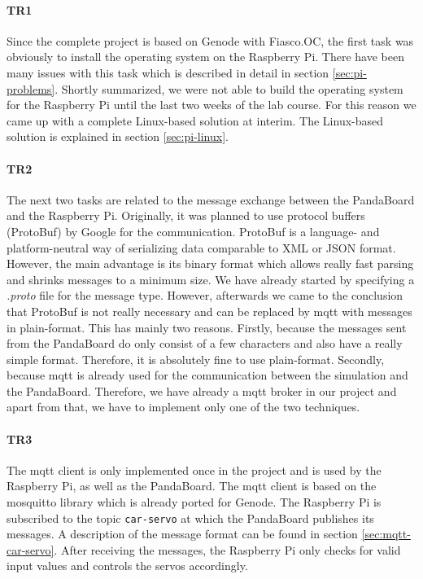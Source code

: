 \paragraph{\textbf{TR1}} Since the complete project is based on Genode with Fiasco.OC, the first task was obviously to install the operating system on the Raspberry Pi. There have been many issues with this task which is described in detail in section \ref{sec:pi-problems}. Shortly summarized, we were not able to build the operating system for the Raspberry Pi until the last two weeks of the lab course. For this reason we came up with a complete Linux-based solution at interim. The Linux-based solution is explained in section \ref{sec:pi-linux}.

\paragraph{\textbf{TR2}} The next two tasks are related to the message exchange between the PandaBoard and the Raspberry Pi. Originally, it was planned to use protocol buffers (ProtoBuf) by Google for the communication. ProtoBuf is a language- and platform-neutral way of serializing data comparable to XML or JSON format. However, the main advantage is its binary format which allows really fast parsing and shrinks messages to a minimum size. We have already started by specifying a \textit{.proto} file for the message type. However, afterwards we came to the conclusion that ProtoBuf is not really necessary and can be replaced by mqtt with messages in plain-format. This has mainly two reasons. Firstly, because the messages sent from the PandaBoard do only consist of a few characters and also have a really simple format. Therefore, it is absolutely fine to use plain-format. Secondly, because mqtt is already used for the communication between the simulation and the PandaBoard. Therefore, we have already a mqtt broker in our project and apart from that, we have to implement only one of the two techniques.

\paragraph{\textbf{TR3}} The mqtt client is only implemented once in the project and is used by the Raspberry Pi, as well as the PandaBoard. The mqtt client is based on the mosquitto library which is already ported for Genode. The Raspberry Pi is subscribed to the topic \texttt{car-servo} at which the PandaBoard publishes its messages. A description of the message format can be found in section \ref{sec:mqtt-car-servo}. After receiving the messages, the Raspberry Pi only checks for valid input values and controls the servos accordingly.

